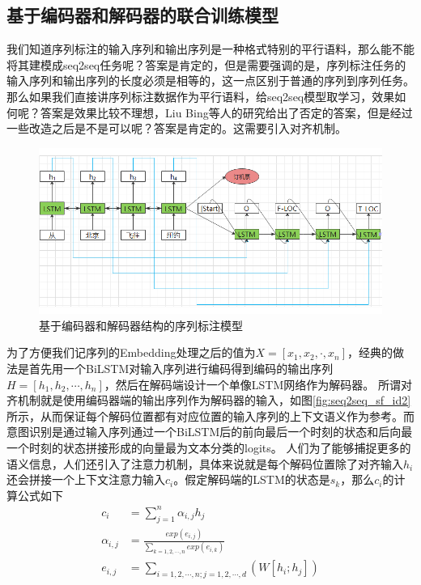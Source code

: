 \documentclass[twoside,a4paper,12pt]{book}%
\begin{document}
\subsection{基于编码器和解码器的联合训练模型}
我们知道序列标注的输入序列和输出序列是一种格式特别的平行语料，那么能不能将其建模成seq2seq任务呢？答案是肯定的，但是需要强调的是，序列标注任务的输入序列和输出序列的长度必须是相等的，这一点区别于普通的序列到序列任务。那么如果我们直接讲序列标注数据作为平行语料，给seq2seq模型取学习，效果如何呢？答案是效果比较不理想，Liu Bing等人的研究给出了否定的答案，但是经过一些改造之后是不是可以呢？答案是肯定的。这需要引入对齐机制。
\begin{figure}[htbp]
\begin{center}
\includegraphics[width=5.6in]{figures/seq2seq_sf_id1.png}
\caption{基于编码器和解码器结构的序列标注模型}
\label{fig:seq2seq_sf_id1}
\end{center}
\end{figure}
为了方便我们记序列的Embedding处理之后的值为$X=[x_1,x_2,\cdot,x_n]$，经典的做法是首先用一个BiLSTM对输入序列进行编码得到编码的输出序列$H=[h_1,h_2,\cdots,h_n]$，然后在解码端设计一个单像\gls{LSTM}网络作为解码器。
所谓对齐机制就是使用编码器端的输出序列作为解码器的输入，如图\ref{fig:seq2seq_sf_id2}所示，从而保证每个解码位置都有对应位置的输入序列的上下文语义作为参考。而意图识别是通过输入序列通过一个BiLSTM后的前向最后一个时刻的状态和后向最一个时刻的状态拼接形成的向量最为文本分类的logits。
人们为了能够捕捉更多的语义信息，人们还引入了注意力机制，具体来说就是每个解码位置除了对齐输入$h_i$还会拼接一个上下文注意力输入$c_i$。假定解码端的\gls{LSTM}的状态是$s_k$，那么$c_i$的计算公式如下
$$
\begin{aligned}
c_i&=\sum_{j=1}^{n}\alpha_{i,j}h_j\\
\alpha_{i,j}&=\frac{exp(e_{i,j})}{\sum_{k=1,2,\cdots,n}{exp(e_{i,k})}}\\
e_{i,j} &= \sum_{i=1,2,\cdots,n;j=1,2,\cdots,d}(W[h_i;h_j])
\end{aligned}
$$
\end{document}
